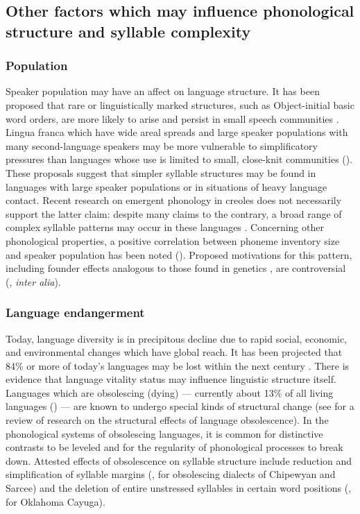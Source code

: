 \subsection{Other factors which may influence phonological structure and syllable complexity}\label{sec:2.1.2}
\subsubsection{{Population}}\label{sec:2.1.2.1}

  Speaker population may have an affect on language structure. It has been proposed that rare or linguistically marked structures, such as Object-initial basic word orders, are more likely to arise and persist in small speech communities \citep{Nettle1999a}. Lingua franca which have wide areal spreads and large speaker populations with many second-language speakers may be more vulnerable to simplificatory pressures than languages whose use is limited to small, close-knit communities (\citealt{Nettle1999b,LupyanDale2010}). These proposals suggest that simpler syllable structures may be found in languages with large speaker populations or in situations of heavy language contact. Recent research on emergent phonology in creoles does not necessarily support the latter claim: despite many claims to the contrary, a broad range of complex syllable patterns may occur in these languages \citep{Schramm2014}. Concerning other phonological properties, a positive correlation between phoneme inventory size and speaker population has been noted (\citealt{HayBauer2007}). Proposed motivations for this pattern, including founder effects analogous to those found in genetics \citep{Atkinson2011}, are controversial (\citealt{Bybee2011,MaddiesonEtAl2011,HunleyEtAl2012}, \textit{inter alia}).

\subsubsection{{Language} {endangerment}}\label{sec:2.1.2.2}

  Today, language diversity is in precipitous decline due to rapid social, economic, and environmental changes which have global reach. It has been projected that 84\% or more of today’s languages may be lost within the next century \citep[113-114]{Nettle1999b}. There is evidence that language vitality status may influence linguistic structure itself. Languages which are obsolescing (dying) — currently about 13\% of all living languages (\citealt{SimonsFennig2018}) — are known to undergo special kinds of structural change (see \citealt{Romaine2010} for a review of research on the structural effects of language obsolescence). In the phonological systems of obsolescing languages, it is common for distinctive contrasts to be leveled and for the regularity of phonological processes to break down. Attested effects of obsolescence on syllable structure include reduction and simplification of syllable margins (\citealt{Cook1989}, for obsolescing dialects of Chipewyan and Sarcee) and the deletion of entire unstressed syllables in certain word positions (\citealt{Mithun1989}, for Oklahoma Cayuga).

